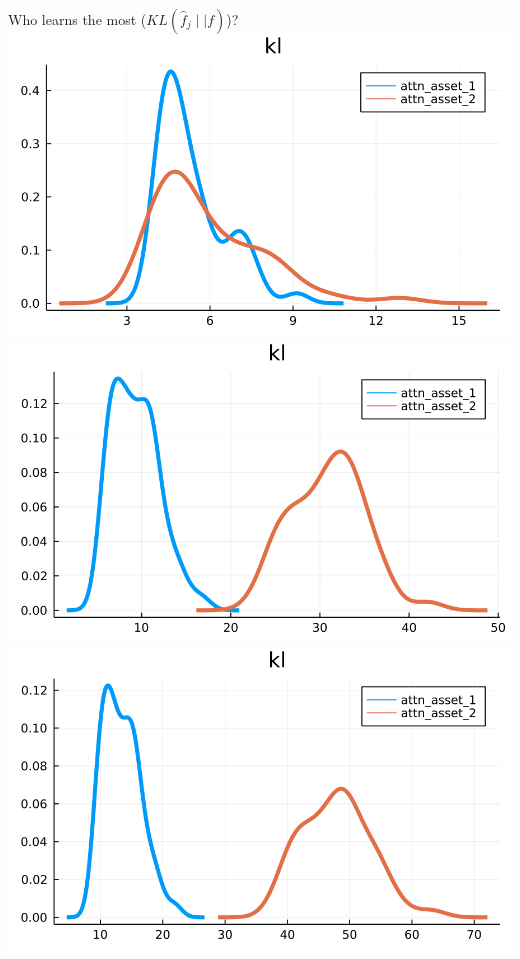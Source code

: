 \documentclass[
  ignorenonframetext,
]{beamer}
\begin{document}
\begin{frame}{Who learns the most (\(KL(\hat f_j \mid\mid f)\))?}
\protect\hypertarget{who-learns-the-most-klhat-f_j-midmid-f}{}
\includegraphics[width=0.4\paperheight]{complexity_files/figure-beamer/unnamed-chunk-19-1}
\includegraphics[width=0.4\paperheight]{complexity_files/figure-beamer/unnamed-chunk-19-2}
\includegraphics[width=0.4\paperheight]{complexity_files/figure-beamer/unnamed-chunk-19-3}

\end{frame}
\end{document}
